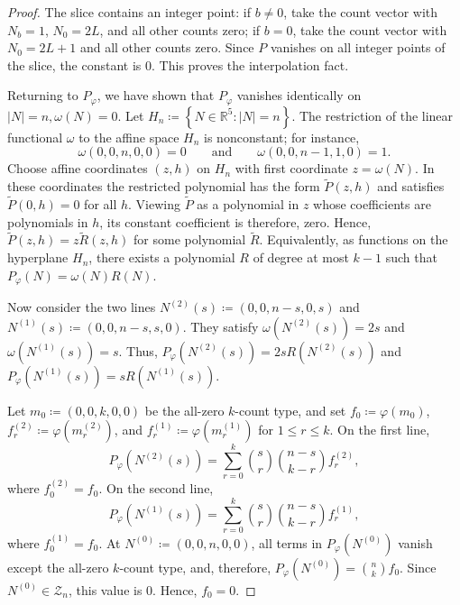 \documentclass[11pt]{amsart}
\theoremstyle{plain}
\theoremstyle{definition}
\theoremstyle{remark}
\numberwithin{equation}{section}
\newcommand{\1}{\mathbf 1}
\begin{document}
\begin{proof}
The slice contains an integer point: if \(b\ne0\), take the count vector with \(N_b=1\), \(N_0=2L\), and all other counts zero; if \(b=0\), take the count vector with \(N_0=2L+1\) and all other counts zero. Since \(P\) vanishes on all integer points of the slice, the constant is \(0\). This proves the interpolation fact.

Returning to \(P_\varphi\), we have shown that \(P_\varphi\) vanishes identically on \(|N|=n,\omega(N)=0\). Let \(H_n\coloneqq\left\{N\in\mathbb R^5\colon |N|=n\right\}\). The restriction of the linear functional \(\omega\) to the affine space \(H_n\) is nonconstant; for instance,
\[
\omega\left(0,0,n,0,0\right)=0
\qquad \text{and} \qquad
\omega\left(0,0,n-1,1,0\right)=1.
\]
Choose affine coordinates \((z,h)\) on \(H_n\) with first coordinate \(z=\omega(N)\). In these coordinates the restricted polynomial has the form \(\tilde P(z,h)\) and satisfies \(\tilde P(0,h)=0\) for all \(h\). Viewing \(\tilde P\) as a polynomial in \(z\) whose coefficients are polynomials in \(h\), its constant coefficient is therefore, zero. Hence, \(\tilde P(z,h)=z\tilde R(z,h)\) for some polynomial \(\tilde R\). Equivalently, as functions on the hyperplane \(H_n\), there exists a polynomial \(R\) of degree at most \(k-1\) such that \(P_\varphi(N)=\omega(N)R(N)\).

Now consider the two lines \(N^{\left(2\right)}\left(s\right)\coloneqq\left(0,0,n-s,0,s\right)\) and \(N^{\left(1\right)}\left(s\right)\coloneqq\left(0,0,n-s,s,0\right)\). They satisfy \(\omega\left(N^{\left(2\right)}\left(s\right)\right)=2s\) and \(\omega\left(N^{\left(1\right)}\left(s\right)\right)=s\). Thus, \(P_\varphi\left(N^{\left(2\right)}\left(s\right)\right)=2sR\left(N^{\left(2\right)}\left(s\right)\right)\) and \(P_\varphi\left(N^{\left(1\right)}\left(s\right)\right)=sR\left(N^{\left(1\right)}\left(s\right)\right)\).

Let \(m_0\coloneqq\left(0,0,k,0,0\right)\) be the all-zero \(k\)-count type, and set \(f_0\coloneqq\varphi\left(m_0\right)\), \(f_r^{\left(2\right)}\coloneqq\varphi\left(m_r^{\left(2\right)}\right)\), and \(f_r^{\left(1\right)}\coloneqq\varphi\left(m_r^{\left(1\right)}\right)\) for \(1\le r\le k\). On the first line,
\[
P_\varphi\left(N^{\left(2\right)}\left(s\right)\right)=\sum_{r=0}^k\binom{s}{r}\binom{n-s}{k-r}f_r^{\left(2\right)},
\]
where \(f_0^{\left(2\right)}=f_0\). On the second line,
\[
P_\varphi\left(N^{\left(1\right)}\left(s\right)\right)=\sum_{r=0}^k\binom{s}{r}\binom{n-s}{k-r}f_r^{\left(1\right)},
\]
where \(f_0^{\left(1\right)}=f_0\). At \(N^{\left(0\right)}\coloneqq\left(0,0,n,0,0\right)\), all terms in \(P_\varphi\left(N^{\left(0\right)}\right)\) vanish except the all-zero \(k\)-count type, and, therefore, \(P_\varphi\left(N^{\left(0\right)}\right)=\binom{n}{k}f_0\). Since \(N^{\left(0\right)}\in\mathcal Z_n\), this value is \(0\). Hence, \(f_0=0\).


\end{proof}
\end{document}
